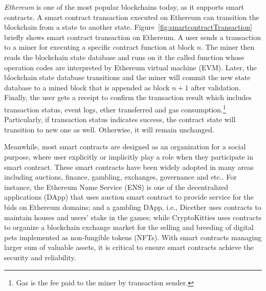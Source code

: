 \emph{Ethereum} is one of the most popular blockchains today, as it supports smart contracts.
A smart contract transaction executed on Ethereum can transition the blockchain from a state to another state.
Figure~\ref{fig:smartcontractTransaction} briefly shows smart contract transaction on Ethereum.
A user sends a transaction to a miner for executing a specific contract function at block $n$.
The miner then reads the blockchain state database and runs on it the called function whose operation codes are interpreted by Ethereum virtual machine (EVM).
Later, the blockchain state database transitions and the miner will commit the new state database to a mined block that is appended as block $n+1$ after validation.
Finally, the user gets a receipt to confirm the transaction result which includes transaction status, event logs, ether transferred and gas consumption.\footnote{Gas is the fee paid to the miner by transaction sender.}
Particularly, if transaction status indicates success, the contract state will transition to new one as well. 
Otherwise, it will remain unchanged.

Meanwhile, most smart contracts are designed as an organization for a social purpose, where user explicitly or implicitly play a role 
when they participate in smart contract.
These smart contracts have been widely adopted in many areas including auctions, finance, gambling, exchanges, governance and etc..
For instance, the Ethereum Name Service (ENS) is one of the decentralized applications (DApp) that uses auction smart contract to provide service for the bids on Ethereum domains;
and a gambling DApp, i.e., Dicether uses contracts to maintain houses and users' stake in the games;
while CryptoKitties uses contracts to organize a blockchain exchange market for the selling and breeding of digital pets implemented as non-fungible tokens (NFTs). 
With smart contracts managing larger sum of valuable assets,
it is critical to ensure smart contracts achieve the security and reliability.

